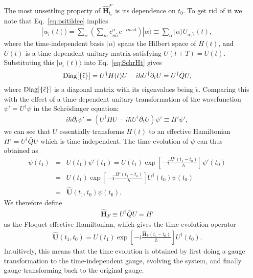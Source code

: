 \documentclass[aps,prb,showpacs,amsmath,amssymb,superscriptaddress]{revtex4-2}
\let\oldhat\hat
\renewcommand{\hat}[1]{\oldhat{\mathbf{#1}}}
\begin{document}
The most unsettling property of $\hat{H}^F_{t_0} $ is its dependence on $t_0$. To get rid of it we note that Eq.~\ref{eq:psitildee} implies
\begin{eqnarray}
	|u_{\tilde{\epsilon}}(t) \rangle =  \sum_{\alpha} \left(\sum_m c_{m \tilde{\epsilon}}^{\alpha} e^{-i m\omega t} \right)|\alpha\rangle \equiv\sum_\alpha  |\alpha\rangle U_{\alpha,\tilde{\epsilon}} (t) ,
\end{eqnarray}
where the time-independent basis $|\alpha\rangle$ spans the Hilbert space of $H(t)$, and $U (t)$ is a time-dependent unitary matrix satisfying $U(t+T) = U(t)$. Substituting this $|u_{\tilde{\epsilon}}(t) \rangle$ into Eq.~\ref{eq:SchrHt} gives
\begin{eqnarray}
	{\rm Diag}[\{\tilde{\epsilon}\}] = U^\dag H (t) U - i\hbar U^\dag \partial_t U = U^\dag \bar{Q} U,
\end{eqnarray}
where ${\rm Diag}[\{\tilde{\epsilon}\}]$ is a diagonal matrix with its eigenvalues being $\tilde{\epsilon}$. Comparing this with the effect of a time-dependent unitary transformation of the wavefunction $\psi' = U^\dag \psi$ in the Schr\"{o}dinger equation:
\begin{eqnarray}
	i\hbar \partial_t \psi' = (U^\dag H U - i\hbar U^\dag \partial_t U)\psi' \equiv H' \psi',
\end{eqnarray}
we can see that $U$ essentially transforms $H(t)$ to an effective Hamiltonian $H' = U^\dag \bar{Q}U$ which is time independent. The time evolution of $\psi$ can thus obtained as
\begin{eqnarray}
	\psi(t_1) &=& U(t_1) \psi'(t_1) = U(t_1) \exp\left[ -i \frac{H' (t_1 - t_0)}{\hbar}  \right] \psi'(t_0) \\\nonumber
	&=&  U(t_1) \exp\left[ -i \frac{H' (t_1 - t_0)}{\hbar}  \right] U^\dag(t_0) \psi(t_0)\\\nonumber
	&=&\hat{U}(t_1,t_0)\psi(t_0).
\end{eqnarray}
We therefore define
\begin{eqnarray}
	\hat{H}_F \equiv U^\dag \bar{Q} U = H'
\end{eqnarray}
as the Floquet effective Hamiltonian, which gives the time-evolution operator
\begin{eqnarray}\label{eq:Ut1t0}
	\hat{U}(t_1,t_0) =  U(t_1) \exp\left[ -i \frac{\hat{H}_F (t_1 - t_0)}{\hbar}  \right] U^\dag(t_0).
\end{eqnarray}
Intuitively, this means that the time evolution is obtained by first doing a gauge transformation to the time-independent gauge, evolving the system, and finally gauge-transforming back to the original gauge.
\end{document}
